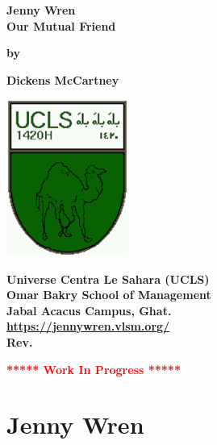 \documentclass[12pt]{book}
\newcommand{\pengarangs}{%
    Dickens McCartney\\
}
\newcommand{\judul}{%
Jenny Wren\\[13pt]
Our Mutual Friend
}
\begin{document}
\begin{titlepage}
    \begin{center}    

    \vspace*{15mm}
    \textbf{\Large \judul}

    \vspace*{30mm}       
    \textbf{by}

    \vspace*{15mm}    
    \textbf{\Large \pengarangs}

    \vspace*{4.0cm}

    \begin{center}
        \includegraphics[width=40mm]{ucls-coat}
    \end{center}

    \textbf{
       Universe Centra Le Sahara (UCLS)\\[10pt]
       Omar Bakry School of Management\\[10pt]
       Jabal Acacus Campus, Ghat. \\[10pt]
       \url{https://jennywren.vlsm.org/} \\[10pt]
       Rev. \rev%
    }

    \vspace*{5mm}    
    \textbf{\LARGE \textcolor{red}{***** Work In Progress *****}}

    \end{center}

\end{titlepage}


\tableofcontents

\newpage

\chapter*{Jenny Wren}
\end{document}
